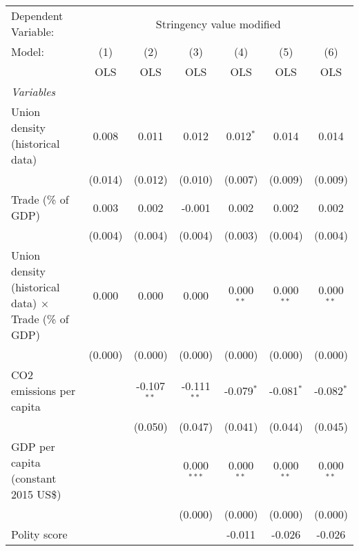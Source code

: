 
\begingroup
\centering
\begin{tabular}{lcccccc}
   \toprule
   Dependent Variable: & \multicolumn{6}{c}{Stringency value modified}\\
   Model:                                                       & (1)     & (2)           & (3)           & (4)          & (5)          & (6)\\  
                                                                &  OLS    & OLS           & OLS           & OLS          & OLS          & OLS\\  
   \midrule
   \emph{Variables}\\
   Union density (historical data)                              & 0.008   & 0.011         & 0.012         & 0.012$^{*}$  & 0.014        & 0.014\\   
                                                                & (0.014) & (0.012)       & (0.010)       & (0.007)      & (0.009)      & (0.009)\\   
   Trade (\% of GDP)                                            & 0.003   & 0.002         & -0.001        & 0.002        & 0.002        & 0.002\\   
                                                                & (0.004) & (0.004)       & (0.004)       & (0.003)      & (0.004)      & (0.004)\\   
   Union density (historical data) $\times$ Trade (\% of GDP)   & 0.000   & 0.000         & 0.000         & 0.000$^{**}$ & 0.000$^{**}$ & 0.000$^{**}$\\   
                                                                & (0.000) & (0.000)       & (0.000)       & (0.000)      & (0.000)      & (0.000)\\   
   CO2 emissions per capita                                     &         & -0.107$^{**}$ & -0.111$^{**}$ & -0.079$^{*}$ & -0.081$^{*}$ & -0.082$^{*}$\\   
                                                                &         & (0.050)       & (0.047)       & (0.041)      & (0.044)      & (0.045)\\   
   GDP per capita (constant 2015 US\$)                          &         &               & 0.000$^{***}$ & 0.000$^{**}$ & 0.000$^{**}$ & 0.000$^{**}$\\   
                                                                &         &               & (0.000)       & (0.000)      & (0.000)      & (0.000)\\   
   Polity score                                                 &         &               &               & -0.011       & -0.026       & -0.026\\   

\end{tabular}
